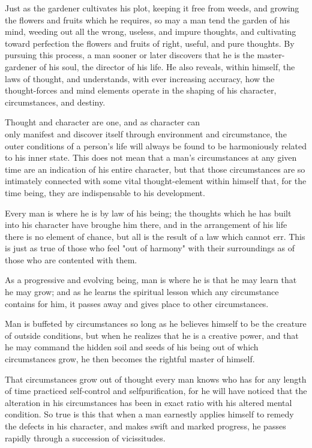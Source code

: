 \documentclass[10pt]{article}
\begin{document}
Just as the gardener cultivates his plot, keeping it free from weeds, and growing the flowers and fruits which he requires, so may a man tend the garden of his mind, weeding out all the wrong, useless, and impure thoughts, and cultivating toward perfection the flowers and fruits of right, useful, and pure thoughts. By pursuing this process, a man sooner or later discovers that he is the master-gardener of his soul, the director of his life. He also reveals, within himself, the laws of thought, and understands, with ever increasing accuracy, how the thought-forces and mind elements operate in the shaping of his character, circumstances, and destiny.

Thought and character are one, and as character can\\
only manifest and discover itself through environment and circumstance, the outer conditions of a person's life will always be found to be harmoniously related to his inner state. This does not mean that a man's circumstances at any given time are an indication of his entire character, but that those circumstances are so intimately connected with some vital thought-element within himself that, for the time being, they are indispensable to his development.

Every man is where he is by law of his being; the thoughts which he has built into his character have broughe him there, and in the arrangement of his life there is no element of chance, but all is the result of a law which cannot err. This is just as true of those who feel "out of harmony" with their surroundings as of those who are contented with them.

As a progressive and evolving being, man is where he is that he may learn that he may grow; and as he learns the spiritual lesson which any circumstance contains for him, it passes away and gives place to other circumstances.

Man is buffeted by circumstances so long as he believes himself to be the creature of outside conditions, but when he realizes that he is a creative power, and that he may command the hidden soil and seeds of his being out of which circumstances grow, he then becomes the rightful master of himself.

That circumstances grow out of thought every man knows who has for any length of time practiced self-control and selfpurification, for he will have noticed that the alteration in his circumstances has been in exact ratio with his altered mental condition. So true is this that when a man earnestly applies himself to remedy the defects in his character, and makes swift and marked progress, he passes rapidly through a succession of vicissitudes.
\end{document}
